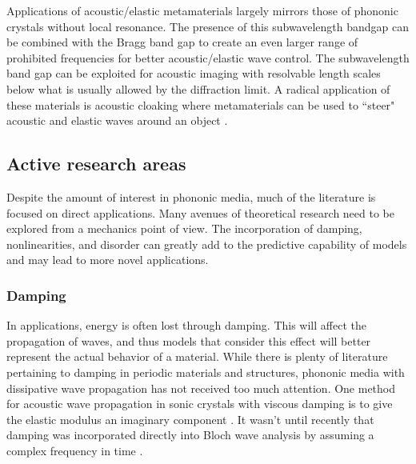 \documentclass{article}
\begin{document}
Applications of acoustic/elastic metamaterials largely mirrors those of 
phononic crystals without local resonance. The presence of this subwavelength 
bandgap can be combined with the Bragg band gap to create an even 
larger range of prohibited frequencies for better acoustic/elastic wave 
control. The subwavelength band gap can be exploited for acoustic imaging with 
resolvable length scales below what is usually allowed by the diffraction 
limit. A radical application of these materials is acoustic cloaking where 
metamaterials can be used to ``steer" acoustic and elastic waves around an 
object \cite{norris11}.


\subsection{Active research areas}
Despite the amount of interest in phononic media, much of the 
literature is focused on direct applications. Many avenues of theoretical 
research need to be explored from a mechanics point of view. The incorporation 
of damping, nonlinearities, and disorder can greatly add to the predictive 
capability of models and may lead to more novel applications. 


\subsubsection{Damping}
In applications, energy is often lost through damping. This will affect the 
propagation of waves, and thus models that consider this effect will better 
represent the actual behavior of a material. While there is plenty of 
literature pertaining to damping in periodic materials and structures, phononic 
media with dissipative wave propagation has not received too much attention. 
One method for acoustic wave propagation in sonic crystals with 
viscous damping is to give the elastic modulus an imaginary component 
\cite{hussein14}. It wasn't until recently that damping was incorporated 
directly into Bloch wave analysis by assuming a complex frequency in time 
\cite{hussein10}.
\end{document}

